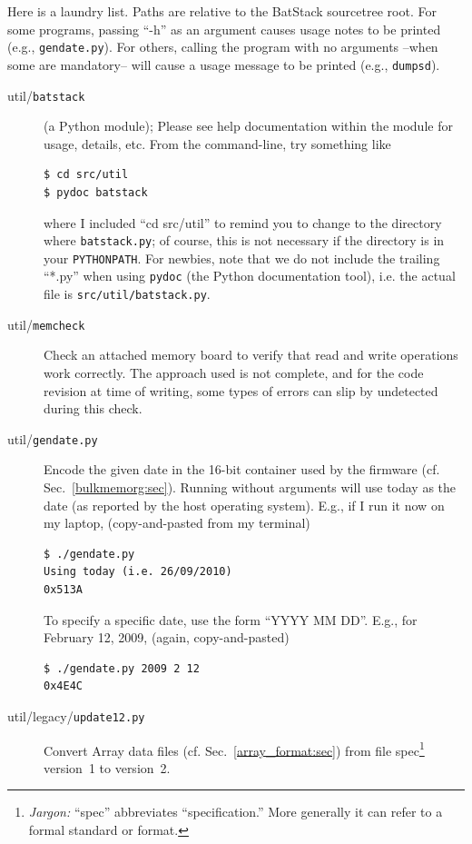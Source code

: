 \documentclass[letterpaper]{article}
\begin{document}
Here is a laundry list. Paths are relative to the BatStack sourcetree
root. For some programs, passing ``-h'' as an argument causes usage
notes to be printed (e.g., \texttt{gendate.py}). For others, calling
the program with no arguments --when some are mandatory-- will cause a
usage message to be printed (e.g., \texttt{dumpsd}).
\begin{description}
\item[util/\texttt{batstack}] (a Python module); Please see help
  documentation within the module for usage, details, etc.  From the
  command-line, try something like
\begin{verbatim}
$ cd src/util
$ pydoc batstack
\end{verbatim}
where I included ``cd src/util'' to remind you to change to the
directory where \texttt{batstack.py}; of course, this is not necessary
if the directory is in your \texttt{PYTHONPATH}. For newbies, note
that we do not include the trailing ``*.py'' when using \texttt{pydoc}
(the Python documentation tool), i.e. the actual file is
\texttt{src/util/batstack.py}.

\item[util/\texttt{memcheck}] Check an attached memory board to verify
  that read and write operations work correctly. The approach used is
  not complete, and for the code revision at time of writing, some
  types of errors can slip by undetected during this check.

\item[util/\texttt{gendate.py}] Encode the given date in the 16-bit
  container used by the firmware
  (cf. Sec.~\ref{bulkmemorg:sec}). Running without arguments will use
  today as the date (as reported by the host operating system). E.g.,
  if I run it now on my laptop, (copy-and-pasted from my terminal)
\begin{verbatim}
$ ./gendate.py
Using today (i.e. 26/09/2010)
0x513A
\end{verbatim}
  To specify a specific date, use the form ``YYYY MM DD''. E.g., for
  February 12, 2009, (again, copy-and-pasted)
\begin{verbatim}
$ ./gendate.py 2009 2 12
0x4E4C
\end{verbatim}

\item[util/legacy/\texttt{update12.py}] Convert Array data files
  (cf. Sec.~\ref{array_format:sec}) from file
  spec\footnote{\textit{Jargon:} ``spec'' abbreviates
    ``specification.'' More generally it can refer to a formal
    standard or format.} version~1 to version~2.
\end{description}
\end{document}
